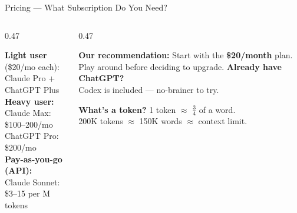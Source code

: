 \documentclass[aspectratio=169, 10pt]{beamer}
\begin{document}
\begin{frame}{Pricing --- What Subscription Do You Need?}
\begin{columns}[T]
\begin{column}{0.47\textwidth}
\begin{tcolorbox}[keybox, title={\faDollarSign\quad Plans}]
\small
\textbf{Light user} (\$20/mo each):\\
Claude Pro + ChatGPT Plus\\[3pt]
\textbf{Heavy user:}\\
Claude Max: \$100--200/mo\\
ChatGPT Pro: \$200/mo\\[3pt]
\textbf{Pay-as-you-go (API):}\\
Claude Sonnet: \$3--15 per M tokens
\end{tcolorbox}
\end{column}
\begin{column}{0.47\textwidth}
\begin{tcolorbox}[accentbox]
\small
\textbf{Our recommendation:}
\vskip2pt
Start with the \textbf{\$20/month} plan. Play around before deciding to upgrade.
\vskip4pt
\textbf{Already have ChatGPT?}\\
Codex is included --- no-brainer to try.
\end{tcolorbox}
\vskip4pt
\begin{tcolorbox}[colback=PaleSage, colframe=CoolGray!50, boxrule=0.4pt, left=4pt, right=4pt, top=2pt, bottom=2pt]
\centering\small
\textbf{What's a token?} 1 token $\approx$ $\frac{3}{4}$ of a word.\\
200K tokens $\approx$ 150K words $\approx$ context limit.
\end{tcolorbox}
\end{column}
\end{columns}
\end{frame}
\end{document}
